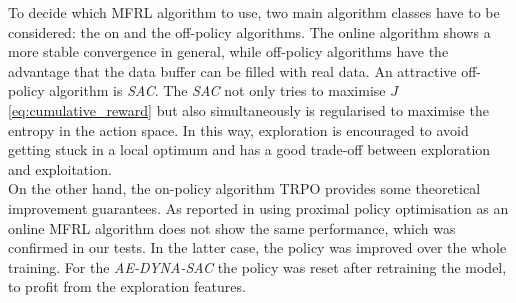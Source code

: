 \documentclass[
reprint,
amsmath,amssymb,amsfonts,clevref,
aps,
prstab,
]{revtex4-2}
\begin{document}
To decide which MFRL algorithm to use, two main algorithm classes have to be considered: the on and the off-policy algorithms. The online algorithm shows a more stable convergence in general, while off-policy algorithms have the advantage that the data buffer can be filled with real data. An attractive off-policy algorithm is \emph{SAC}. The \emph{SAC} not only tries to maximise $J$ \cref{eq:cumulative_reward} but also simultaneously is regularised to maximise the entropy in the action space. In this way, exploration is encouraged to avoid getting stuck in a local optimum and has a good trade-off between exploration and exploitation.\\
On the other hand, the on-policy algorithm TRPO \cite{Schulman2015} provides some theoretical improvement guarantees. As reported in \cite{Kurutach2018} using proximal policy optimisation \cite{Schulman2017} as an online MFRL algorithm does not show the same performance, which was confirmed in our tests. In the latter case, the policy was improved over the whole training. For the \emph{AE-DYNA-SAC} the policy was reset after retraining the model, to profit from the exploration features.
\end{document}
